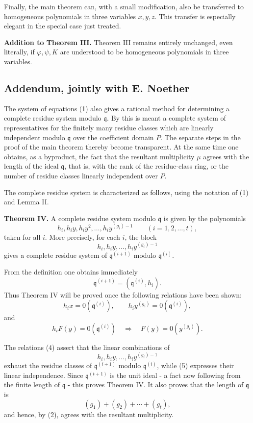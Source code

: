 \documentclass[11pt]{article}
\begin{document}
Finally, the main theorem can, with a small modification, also be transferred to homogeneous polynomials in three variables \(x,y,z\). This transfer is especially elegant in the special case just treated.

\textbf{Addition to Theorem III.} Theorem III remains entirely unchanged, even literally, if \(\varphi,\psi,K\) are understood to be homogeneous polynomials in three variables.

\subsection{Addendum, jointly with E. Noether}

The system of equations (1) also gives a rational method for determining a complete residue system modulo \(\mathfrak q\). By this is meant a complete system of representatives for the finitely many residue classes which are linearly independent modulo \(\mathfrak q\) over the coefficient domain \(P\). The separate steps in the proof of the main theorem thereby become transparent. At the same time one obtains, as a byproduct, the fact that the resultant multiplicity \(\mu\) agrees with the length of the ideal \(\mathfrak q\), that is, with the rank of the residue-class ring, or the number of residue classes linearly independent over \(P\).

The complete residue system is characterized as follows, using the notation of (1) and Lemma II.

\textbf{Theorem IV.} A complete residue system modulo \(\mathfrak q\) is given by the polynomials
\[
  h_i,
  h_i y,
  h_i y^2,
  \ldots,
  h_i y^{(g_i)-1}
  \qquad (i=1,2,\ldots,t),
\]
taken for all \(i\). More precisely, for each \(i\), the block
\[
  h_i,
  h_i y,
  \ldots,
  h_i y^{(g_i)-1}
\]
gives a complete residue system of \(\mathfrak q^{(i+1)}\) modulo \(\mathfrak q^{(i)}\).

From the definition one obtains immediately
\[
  \mathfrak q^{(i+1)}=(\mathfrak q^{(i)},h_i).
\]
Thus Theorem IV will be proved once the following relations have been shown:
\[
  h_i x=0(\mathfrak q^{(i)}),
  \qquad
  h_i y^{(g_i)}=0(\mathfrak q^{(i)}),
\tag{4}
\]
and
\[
  h_iF(y)=0(\mathfrak q^{(i)})
  \quad\Longrightarrow\quad
  F(y)=0(y^{(g_i)}).
\tag{5}
\]

The relations (4) assert that the linear combinations of
\[
  h_i,
  h_i y,
  \ldots,
  h_i y^{(g_i)-1}
\]
exhaust the residue classes of \(\mathfrak q^{(i+1)}\) modulo \(\mathfrak q^{(i)}\), while (5) expresses their linear independence. Since \(\mathfrak q^{(t+1)}\) is the unit ideal - a fact now following from the finite length of \(\mathfrak q\) - this proves Theorem IV. It also proves that the length of \(\mathfrak q\) is
\[
  (g_1)+(g_2)+\cdots+(g_t),
\]
and hence, by (2), agrees with the resultant multiplicity.
\end{document}
